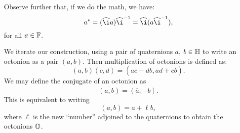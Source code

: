 Observe further that, if we do the math, we have:
\begin{equation}
a^{*} = (\widehat{\i}a)\widehat{\i}^{-1} = \widehat{\i}(a\widehat{\i}^{-1}),
\end{equation}
for all $a\in\mathbb{F}$.

We iterate our construction, using a pair of quaternions $a$, $b\in\mathbb{H}$
to write an octonion as a pair $(a, b)$. Then multiplication of
octonions is defined as:
\begin{equation}
(a, b)(c,  d) =(ac - d\bar{b}, \bar{a}d+cb).
\end{equation}
We may define the conjugate of an octonion as
\begin{equation}
\overline{(a,b)} = (\overline{a}, -b).
\end{equation}
This is equivalent to writing
\begin{equation}
(a, b) = a + \ell b,
\end{equation}
where $\ell$ is the new ``number'' adjoined to the quaternions to obtain
the octonions $\mathbb{O}$.
